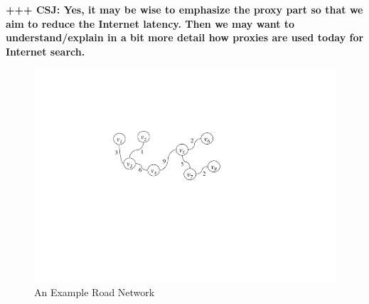 \documentclass{sig-alternate}
\begin{document}



%
%
%



{\bf +++ CSJ: Yes, it may be wise to emphasize the proxy part so that we aim to reduce the Internet latency. Then we may want to understand/explain in a bit more detail how proxies are used today for Internet search.}



\begin{figure}[hbt]
  \center
        \includegraphics[width=0.7\columnwidth]{figures/rxmap}
        \caption{An Example Road Network}
  \label{fig:rxmap}
\end{figure}
\end{document}
